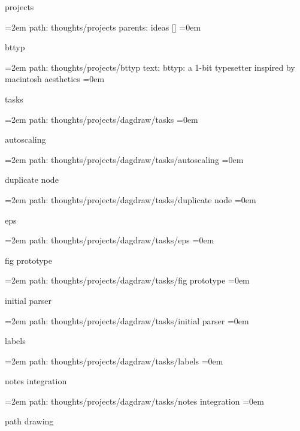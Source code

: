 \par\endgroup
\bigskip
{}
projects
\smallskip
\par\begingroup
\leftskip=2em
path: thoughts/projects
\smallskip
parents:  ideas []
\smallskip
\leftskip=0em
\par\endgroup
\bigskip
{}
bttyp
\smallskip
\par\begingroup
\leftskip=2em
path: thoughts/projects/bttyp
\smallskip
text:  bttyp: a 1-bit typesetter inspired by macintosh aesthetics
\smallskip
\leftskip=0em
\par\endgroup
\bigskip
{}
tasks
\smallskip
\par\begingroup
\leftskip=2em
path: thoughts/projects/dagdraw/tasks
\smallskip
\leftskip=0em
\par\endgroup
\bigskip
{}
autoscaling
\smallskip
\par\begingroup
\leftskip=2em
path: thoughts/projects/dagdraw/tasks/autoscaling
\smallskip
\leftskip=0em
\par\endgroup
\bigskip
{}
duplicate node
\smallskip
\par\begingroup
\leftskip=2em
path: thoughts/projects/dagdraw/tasks/duplicate node
\smallskip
\leftskip=0em
\par\endgroup
\bigskip
{}
eps
\smallskip
\par\begingroup
\leftskip=2em
path: thoughts/projects/dagdraw/tasks/eps
\smallskip
\leftskip=0em
\par\endgroup
\bigskip
{}
fig prototype
\smallskip
\par\begingroup
\leftskip=2em
path: thoughts/projects/dagdraw/tasks/fig prototype
\smallskip
\leftskip=0em
\par\endgroup
\bigskip
{}
initial parser
\smallskip
\par\begingroup
\leftskip=2em
path: thoughts/projects/dagdraw/tasks/initial parser
\smallskip
\leftskip=0em
\par\endgroup
\bigskip
{}
labels
\smallskip
\par\begingroup
\leftskip=2em
path: thoughts/projects/dagdraw/tasks/labels
\smallskip
\leftskip=0em
\par\endgroup
\bigskip
{}
notes integration
\smallskip
\par\begingroup
\leftskip=2em
path: thoughts/projects/dagdraw/tasks/notes integration
\smallskip
\leftskip=0em
\par\endgroup
\bigskip
{}
path drawing
\smallskip
\par\begingroup
